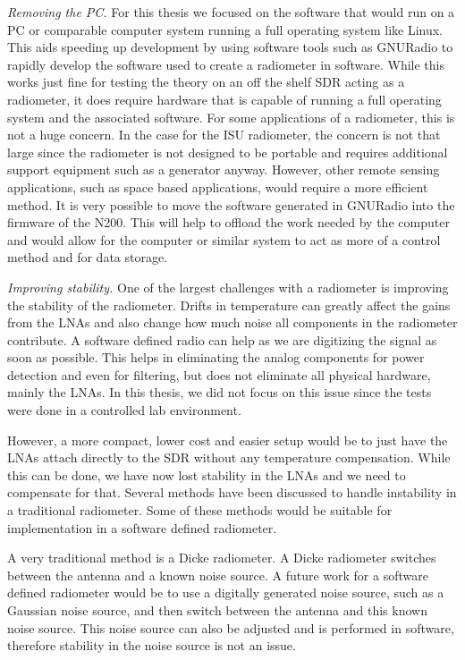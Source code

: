 \emph{Removing the PC.}  For this thesis we focused on the software that would run on a PC or comparable computer system running a full operating system like Linux.  This aids speeding up development by using software tools such as GNURadio to rapidly develop the software used to create a radiometer in software.  While this works just fine for testing the theory on an off the shelf SDR acting as a radiometer, it does require hardware that is capable of running a full operating system and the associated software.  For some applications of a radiometer, this is not a huge concern.  In the case for the ISU radiometer, the concern is not that large since the radiometer is not designed to be portable and requires additional support equipment such as a generator anyway.  However, other remote sensing applications, such as space based applications, would require a more efficient method.  It is very possible to move the software generated in GNURadio into the firmware of the N200.  This will help to offload the work needed by the computer and would allow for the computer or similar system to act as more of a control method and for data storage.  

\emph{Improving stability.}  One of the largest challenges with a radiometer is improving the stability of the radiometer.  Drifts in temperature can greatly affect the gains from the LNAs and also change how much noise all components in the radiometer contribute.  A software defined radio can help as we are digitizing the signal as soon as possible.  This helps in eliminating the analog components for power detection and even for filtering, but does not eliminate all physical hardware, mainly the LNAs.  In this thesis, we did not focus on this issue since the tests were done in a controlled lab environment.

However, a more compact, lower cost and easier setup would be to just have the LNAs attach directly to the SDR without any temperature compensation.  While this can be done, we have now lost stability in the LNAs and we need to compensate for that.  Several methods have been discussed to handle instability in a traditional radiometer.  Some of these methods would be suitable for implementation in a software defined radiometer.

A very traditional method is a Dicke radiometer.  A Dicke radiometer switches between the antenna and a known noise source.  A future work for a software defined radiometer would be to use a digitally generated noise source, such as a Gaussian noise source, and then switch between the antenna and this known noise source.  This noise source can also be adjusted and is performed in software, therefore stability in the noise source is not an issue.  

